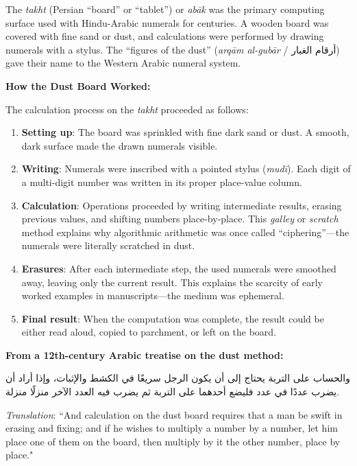 \documentclass[11pt,a4paper]{article}
\newcommand{\ar}[1]{{\arabicfont #1}}
\newenvironment{arabicpassage}{%
  \begin{tcolorbox}[colback=arabicbg,colframe=rulecolor,boxrule=0.5pt,
    left=8pt,right=8pt,top=6pt,bottom=6pt,fontupper=\arabicfont\large]
}{\end{tcolorbox}}
\newenvironment{enhancednote}{%
  \begin{tcolorbox}[colback=enhancedbg,colframe=notecolor,boxrule=1pt,
    left=10pt,right=10pt,top=8pt,bottom=8pt,
    title={\textbf{Enhanced Edition Note}},fonttitle=\bfseries\color{notecolor}]
}{\end{tcolorbox}}
\begin{document}
\begin{enhancednote}
The \textit{takht} (Persian ``board'' or ``tablet'') or \textit{ab\=ak} was the primary computing surface used with Hindu-Arabic numerals for centuries. A wooden board was covered with fine sand or dust, and calculations were performed by drawing numerals with a stylus. The ``figures of the dust'' (\textit{arq\=am al-gub\=ar} / \ar{أرقام الغبار}) gave their name to the Western Arabic numeral system.
\end{enhancednote}

\textbf{How the Dust Board Worked:}

The calculation process on the \textit{takht} proceeded as follows:

\begin{enumerate}[leftmargin=2em,itemsep=4pt]
  \item \textbf{Setting up}: The board was sprinkled with fine dark sand or dust. A smooth, dark surface made the drawn numerals visible.

  \item \textbf{Writing}: Numerals were inscribed with a pointed stylus (\textit{mud\=i}). Each digit of a multi-digit number was written in its proper place-value column.

  \item \textbf{Calculation}: Operations proceeded by writing intermediate results, erasing previous values, and shifting numbers place-by-place. This \textit{galley} or \textit{scratch} method explains why algorithmic arithmetic was once called ``ciphering''---the numerals were literally scratched in dust.

  \item \textbf{Erasures}: After each intermediate step, the used numerals were smoothed away, leaving only the current result. This explains the scarcity of early worked examples in manuscripts---the medium was ephemeral.

  \item \textbf{Final result}: When the computation was complete, the result could be either read aloud, copied to parchment, or left on the board.
\end{enumerate}

\begin{arabicpassage}
\textbf{From a 12th-century Arabic treatise on the dust method:}

\vspace{0.5em}
\ar{والحساب على التربة يحتاج إلى أن يكون الرجل سريعًا في الكشط والإثبات، وإذا أراد أن يضرب عددًا في عدد فليضع أحدهما على التربة ثم يضرب فيه العدد الآخر منزلًا منزلة.}

\vspace{0.5em}
\textit{Translation}: ``And calculation on the dust board requires that a man be swift in erasing and fixing; and if he wishes to multiply a number by a number, let him place one of them on the board, then multiply by it the other number, place by place."
\end{arabicpassage}
\end{document}

